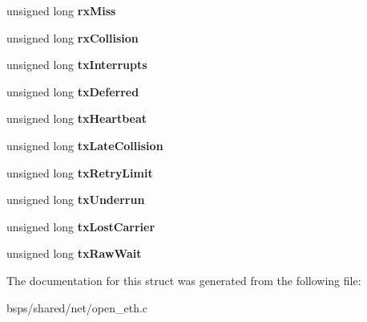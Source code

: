 \begin{DoxyCompactItemize}
\item 
\mbox{\label{structopen__eth__softc_aa3bc1b992e0a4a9b00ced7d2462cc5b8}} 
unsigned long {\bfseries rx\+Miss}
\item 
\mbox{\label{structopen__eth__softc_a540529b27ed816ae0289e57328194710}} 
unsigned long {\bfseries rx\+Collision}
\item 
\mbox{\label{structopen__eth__softc_a46a9b6a529abca6940227bf11f07b031}} 
unsigned long {\bfseries tx\+Interrupts}
\item 
\mbox{\label{structopen__eth__softc_ae3ef2492403edca4437f0592b3a003a4}} 
unsigned long {\bfseries tx\+Deferred}
\item 
\mbox{\label{structopen__eth__softc_a431b25855ba32a33a81134ed401ab4f8}} 
unsigned long {\bfseries tx\+Heartbeat}
\item 
\mbox{\label{structopen__eth__softc_acba05860583194de55adc97afe79df9f}} 
unsigned long {\bfseries tx\+Late\+Collision}
\item 
\mbox{\label{structopen__eth__softc_a0e681f2d7c440c9069c59dbb2bcac7f9}} 
unsigned long {\bfseries tx\+Retry\+Limit}
\item 
\mbox{\label{structopen__eth__softc_a703c6161c0e63248a1be78024b17a98f}} 
unsigned long {\bfseries tx\+Underrun}
\item 
\mbox{\label{structopen__eth__softc_aa0235380c6df59cd6b558ff5f153e879}} 
unsigned long {\bfseries tx\+Lost\+Carrier}
\item 
\mbox{\label{structopen__eth__softc_a00c3e68c3dabc74175b818374cec54ed}} 
unsigned long {\bfseries tx\+Raw\+Wait}
\end{DoxyCompactItemize}


The documentation for this struct was generated from the following file\+:\begin{DoxyCompactItemize}
\item 
bsps/shared/net/open\+\_\+eth.\+c\end{DoxyCompactItemize}
